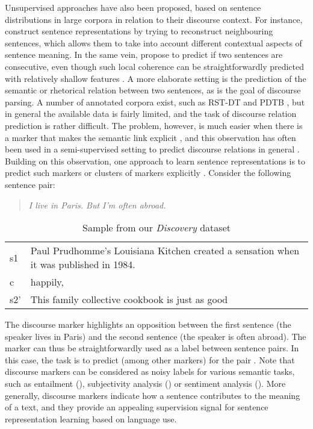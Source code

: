 \documentclass[11pt,a4paper]{article}
\begin{document}
Unsupervised approaches have also been proposed, based on sentence distributions in large corpora in relation to their discourse context.
For instance, \citet{Kiros2015} construct sentence representations by trying to reconstruct neighbouring sentences, which allows them to take into account different contextual aspects of sentence meaning. In the same vein, \citet{Logeswaran2016} propose to predict if two sentences are consecutive, even though such local coherence can be straightforwardly predicted with relatively shallow features \citep{Barzilay2008}.
A more elaborate setting is the prediction of the semantic or rhetorical relation between two sentences, as is the goal of discourse parsing. A number of annotated corpora exist, such as RST-DT \cite{DBLP:conf/sigdial/CarlsonMO01} and PDTB \cite{pdtb2.0}, 
but in general the available data is fairly limited, and the task of discourse relation prediction is rather difficult. The problem, however, is much easier when there is a marker that makes the semantic link explicit \citep{pitler2008}, and this observation has often been used in a semi-supervised setting to predict discourse relations in general \cite{RutherfordX15}. Building on this observation, one approach to learn sentence representations is to predict such markers or clusters of markers explicitly \citep{Jernite2017,Malmi2018,Nie2017}. 
Consider the following sentence pair:
 \begin{quote}
\textit{I live in Paris. But I'm often abroad.}
\end{quote}


\begin{table*}[htb]
\begin{tabular}{l|l}
s1 & Paul Prudhomme's Louisiana Kitchen created a sensation when it was published in 1984.\\
c  & happily,                                                                                                                          \\
s2' & This family collective cookbook is just as good                                                                                  
\end{tabular}
\caption{Sample from our \textit{Discovery} dataset}
\label{tab:sample}
\end{table*}


The discourse marker  highlights an opposition between the first sentence (the speaker lives in Paris) and the second sentence (the speaker is often abroad).
The marker can thus be straightforwardly used as a label between sentence pairs. In this case, the task is to predict  (among other markers) for the pair .
Note that discourse markers can be considered as noisy labels for various semantic tasks, such as entailment (), subjectivity analysis () or sentiment analysis (). 
More generally, discourse markers indicate how a sentence contributes to the meaning of a text, and they provide an appealing supervision signal for sentence representation learning based on language use. 
\end{document}
